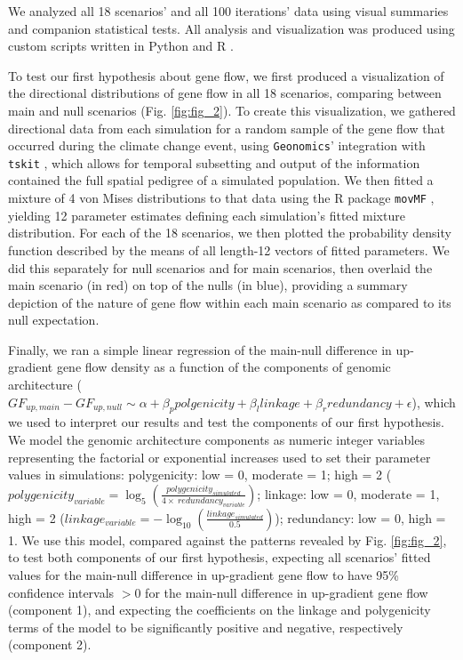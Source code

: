 \documentclass[9pt,twocolumn,twoside,lineno]{pnas-new}
\begin{document}
{We analyzed all 18 scenarios' and all 100 iterations' data
using visual summaries and companion statistical tests.
All analysis and visualization was produced using custom scripts written in 
Python and R \cite{r_core_team}.

To test our first hypothesis about gene flow,
we first produced a visualization of the directional 
distributions of gene flow in all 18 scenarios, comparing between main
and null scenarios (Fig. \ref{fig:fig_2}).
To create this visualization, we gathered directional data
from each simulation for a random 
sample of the gene flow that occurred during the climate change event, using 
\texttt{Geonomics}' integration with \texttt{tskit} \cite{kelleher}, which allows for temporal 
subsetting and output of the information contained the full spatial pedigree of a 
simulated population. We then fitted a mixture of 4 von Mises distributions to that data
using the R package \texttt{movMF} \cite{hornik},
yielding 12 parameter estimates defining each simulation's fitted mixture distribution. For each of 
the 18 scenarios, we then plotted the probability density function 
described by the means of all length-12 vectors of fitted parameters. We did this 
separately for null scenarios and for main scenarios, then overlaid the main scenario (in red)
on top of the nulls (in blue), providing a summary depiction of the nature of gene flow within each 
main scenario as compared to its null expectation.

Finally, we ran a simple linear regression
of the main-null difference in up-gradient gene flow density
as a function of the components of genomic architecture
($GF_{up,main}-GF_{up,null} \sim \alpha + \beta_{p}polgenicity + \beta_{l}linkage + \beta_{r}redundancy + \epsilon$),
which we used to interpret our results and test the components of our first hypothesis.
We model the genomic architecture components
as numeric integer variables
representing the factorial or exponential increases
used to set their parameter values in simulations:
polygenicity: low = 0, moderate = 1; high = 2 ($polygenicity_{variable}=\log_{5}(\frac{polygenicity_{simulated}}{4\times\ redundancy_{variable}})$;
linkage: low = 0, moderate = 1, high = 2 ($linkage_{variable}=-\log_{10}(\frac{linkage_{simulated}}{0.5})$);
redundancy: low = 0, high = 1.
We use this model, compared against
the patterns revealed by Fig. \ref{fig:fig_2},
to test both components of our first hypothesis,
expecting all scenarios' fitted values
for the main-null difference in up-gradient gene flow
to have 95\% confidence intervals $>0$ for the main-null difference in up-gradient gene flow (component 1),
and expecting the coefficients on the linkage and polygenicity
terms of the model to be significantly positive and
negative, respectively (component 2).

}
\end{document}
